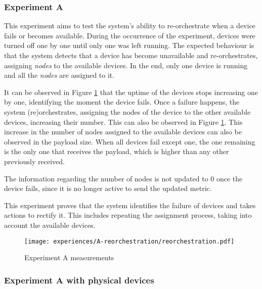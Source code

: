 
\subsubsection{Experiment A}\label{sec:exp_a}

This experiment aims to test the system's ability to re-orchestrate when a device fails or becomes available. During the occurrence of the experiment, devices were turned off one by one until only one was left running. The expected behaviour is that the system detects that a device has become unavailable and re-orchestrates, assigning \textit{nodes} to the available devices. In the end, only one device is running and all the \textit{nodes} are assigned to it.

It can be observed in Figure \ref{fig:experiment_a_graph} that the uptime of the devices stops increasing one by one, identifying the moment the device fails. Once a failure happens, the system (re)orchestrates, assigning the nodes of the device to the other available devices, increasing their number. This can also be observed in Figure \ref{fig:experiment_a_graph}. This increase in the number of nodes assigned to the available devices can also be observed in the payload size. When all devices fail except one, the one remaining is the only one that receives the payload, which is higher than any other previously received.

The information regarding the number of nodes is not updated to 0 once the device fails, since it is no longer active to send the updated metric. 

This experiment proves that the system identifies the failure of devices and takes actions to rectify it. This includes repeating the assignment process, taking into account the available devices.

\begin{figure}[h]
\centering
\texttt{[image: experiences/A-reorchestration/reorchestration.pdf]}
\caption[Experiment A measurements]{Experiment A measurements}\label{fig:experiment_a_graph}
\end{figure}


\subsubsection{Experiment A with physical devices}

